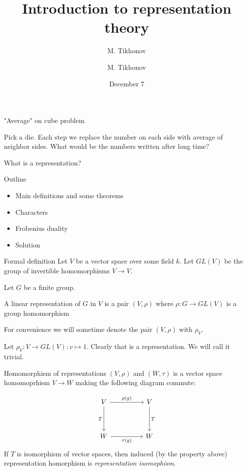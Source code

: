 \documentclass{beamer}
\author{M. Tikhonov}
\title{Introduction to representation theory}
\author{M. Tikhonov}
\institute{University of Virginia}
\date{December 7}
\begin{document}
\frame{\titlepage}

\begin{frame}{"Average" on cube problem}
    \begin{example}
        Pick a die. Each step we replace the number on each side with average of neighbor sides.
    What would be the numbers written after long time?
    \end{example}
\end{frame}

\begin{frame}{What is a representation?}

\end{frame}

\begin{frame}{Outline}
    \begin{itemize} 
        \item Main definitions and some theorems
        \item Characters
        \item Frobenius duality
        \item Solution
    \end{itemize}
\end{frame}

\begin{frame}{Formal definition}
    Let $V$ be a vector space over some field $k$. Let $GL(V)$ be the group of invertible homomorphisms $V \to V$.

    Let $G$ be a finite group.
    \begin{definition}
        A linear representation of $G$ in $V$ is a pair $(V, \rho)$ where $\rho: G \to GL(V)$ is a group homomorphism
    \end{definition}

    For convenience we will sometime denote the pair $(V, \rho)$ with $\rho_V$.

    \begin{example}
        Let $\rho_V : V \to GL(V): v \mapsto 1$.
        Clearly that is a representation. We will call it trivial.
    \end{example}

\end{frame}

\begin{frame}[fragile]
    \begin{definition}
        Homomorphism of representations $(V, \rho)$ and $(W, \tau)$ is a vector space homomoprhism $V \to W$ making the following diagram commute:
    \end{definition}
    \[\begin{tikzcd}
        V && V \\
        \\
        W && W
        \arrow["{\rho(g)}", from=1-1, to=1-3]
        \arrow["T", from=1-3, to=3-3]
        \arrow["T"', from=1-1, to=3-1]
        \arrow["{\tau(g)}"', from=3-1, to=3-3]
    \end{tikzcd}\]
    If $T$ is isomorphism of vector spaces, then induced (by the property above) representation homorphism is \textit{representation isomophism}.
\end{frame}
\end{document}
